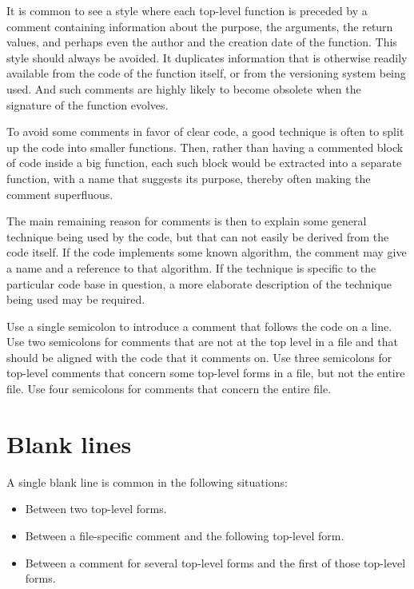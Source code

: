 It is common to see a style where each top-level function is preceded
by a comment containing information about the purpose, the arguments,
the return values, and perhaps even the author and the creation date
of the function.  This style should always be avoided.  It duplicates
information that is otherwise readily available from the code of the
function itself, or from the versioning system being used.  And such
comments are highly likely to become obsolete when the signature of
the function evolves.

To avoid some comments in favor of clear code, a good technique is
often to split up the code into smaller functions.  Then, rather than
having a commented block of code inside a big function, each such
block would be extracted into a separate function, with a name that
suggests its purpose, thereby often making the comment superfluous.

The main remaining reason for comments is then to explain some
general technique being used by the code, but that can not easily be
derived from the code itself.  If the code implements some known
algorithm, the comment may give a name and a reference to that
algorithm.  If the technique is specific to the particular code base
in question, a more elaborate description of the technique being used
may be required.

Use a single semicolon to introduce a comment that follows the code on
a line.  Use two semicolons for comments that are not at the top level
in a file and that should be aligned with the code that it comments
on.  Use three semicolons for top-level comments that concern some
top-level forms in a file, but not the entire file.  Use four
semicolons for comments that concern the entire file.

\section{Blank lines}

A single blank line is common in the following situations:

\begin{itemize}
\item Between two top-level forms.
\item Between a file-specific comment and the following top-level
  form.
\item Between a comment for several top-level forms and the first
  of those top-level forms.
\end{itemize}

